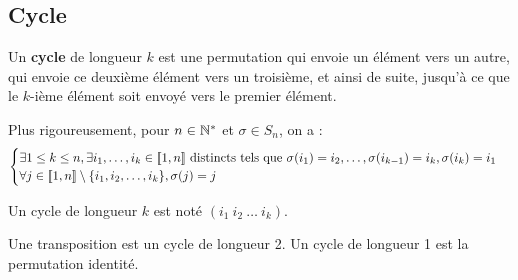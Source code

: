 \documentclass[12pt, a4paper]{report}
\begin{document}
\subsection{Cycle}

\begin{definition}[Cycle]
    Un \textbf{cycle} de longueur $k$ est une permutation qui envoie un élément vers un autre, qui envoie ce deuxième élément vers un troisième, et ainsi de suite, jusqu'à ce que le $k$-ième élément soit envoyé vers le premier élément.

    Plus rigoureusement, pour $n \in \mathbb{N}^*$ et $\sigma \in S_n$, on a :
    $$\begin{cases}
    \exists 1 \le k \le n, \exists i_1, \dots, i_k \in [\![1,n]\!] \text{ distincts} \text{ tels que } \sigma(i_1) = i_2, \dots, \sigma(i_{k-1}) = i_k, \sigma(i_k) = i_1 \\
    \forall j \in [\![1,n]\!] \setminus \{i_1, i_2, \dots, i_k\}, \sigma(j) = j
    \end{cases}$$

    Un cycle de longueur $k$ est noté $(i_1 \ i_2 \ \dots \ i_k)$.
\end{definition}

\begin{remark}
    Une transposition est un cycle de longueur 2. Un cycle de longueur 1 est la permutation identité.
\end{remark}
\end{document}
